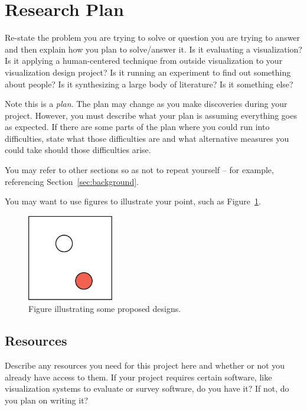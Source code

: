 \section{Research Plan} 
\label{sec:research}


Re-state the problem you are trying to solve or question you are trying to
answer and then explain how you plan to solve/answer it. Is it evaluating a
visualization? Is it applying a human-centered technique from outside
visualization to your visualization design project? Is it running an
experiment to find out something about people? Is it synthesizing a large
body of literature? Is it something else?

Note this is a {\em plan}. The plan may change as you make discoveries during
your project. However, you must describe what your plan is assuming everything
goes as expected. If there are some parts of the plan where you could run into
difficulties, state what those difficulties are and what alternative measures
you could take should those difficulties arise.

You may refer to other sections so as not to repeat yourself -- for example,
referencing Section~\ref{sec:background}.

You may want to use figures to illustrate your point, such as
Figure~\ref{fig:sample}.

\begin{figure}[h]
 \centering %
 \includegraphics[width=1.5in]{figs/sample}
 \caption{Figure illustrating some proposed designs.}
 \label{fig:sample}
\end{figure}

\subsection{Resources}
\label{sec:resources}

Describe any resources you need for this project here and whether or not you
already have access to them. If your project requires certain software, like
visualization systems to evaluate or survey software, do you have it? If not,
do you plan on writing it?

